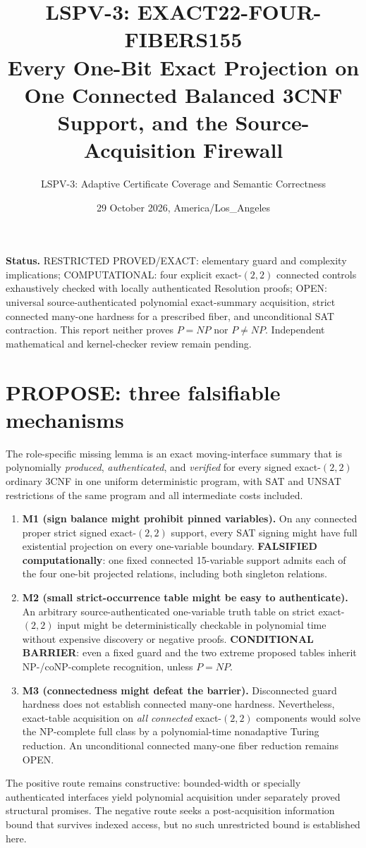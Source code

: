\documentclass[11pt]{article}
\title{LSPV-3: EXACT22-FOUR-FIBERS155\\Every One-Bit Exact Projection on One Connected Balanced 3CNF Support, and the Source-Acquisition Firewall}
\author{LSPV-3: Adaptive Certificate Coverage and Semantic Correctness}
\date{29 October 2026, America/Los\_Angeles}
\begin{document}
\maketitle
\noindent\textbf{Status.} RESTRICTED PROVED/EXACT: elementary guard and complexity implications; COMPUTATIONAL: four explicit exact-$(2,2)$ connected controls exhaustively checked with locally authenticated Resolution proofs; OPEN: universal source-authenticated polynomial exact-summary acquisition, strict connected many-one hardness for a prescribed fiber, and unconditional SAT contraction. This report neither proves $P=NP$ nor $P\ne NP$. Independent mathematical and kernel-checker review remain pending.

\section{PROPOSE: three falsifiable mechanisms}
The role-specific missing lemma is an exact moving-interface summary that is polynomially \emph{produced}, \emph{authenticated}, and \emph{verified} for every signed exact-$(2,2)$ ordinary 3CNF in one uniform deterministic program, with SAT and UNSAT restrictions of the same program and all intermediate costs included.
\begin{enumerate}
\item[] \textbf{M1 (sign balance might prohibit pinned variables).} On any connected proper strict signed exact-$(2,2)$ support, every SAT signing might have full existential projection on every one-variable boundary. \textbf{FALSIFIED computationally}: one fixed connected 15-variable support admits each of the four one-bit projected relations, including both singleton relations.
\item[] \textbf{M2 (small strict-occurrence table might be easy to authenticate).} An arbitrary source-authenticated one-variable truth table on strict exact-$(2,2)$ input might be deterministically checkable in polynomial time without expensive discovery or negative proofs. \textbf{CONDITIONAL BARRIER}: even a fixed guard and the two extreme proposed tables inherit NP-/coNP-complete recognition, unless $P=NP$.
\item[] \textbf{M3 (connectedness might defeat the barrier).} Disconnected guard hardness does not establish connected many-one hardness. Nevertheless, exact-table acquisition on \emph{all connected} exact-$(2,2)$ components would solve the NP-complete full class by a polynomial-time nonadaptive Turing reduction. An unconditional connected many-one fiber reduction remains OPEN.
\end{enumerate}
The positive route remains constructive: bounded-width or specially authenticated interfaces yield polynomial acquisition under separately proved structural promises. The negative route seeks a post-acquisition information bound that survives indexed access, but no such unrestricted bound is established here.
\end{document}
